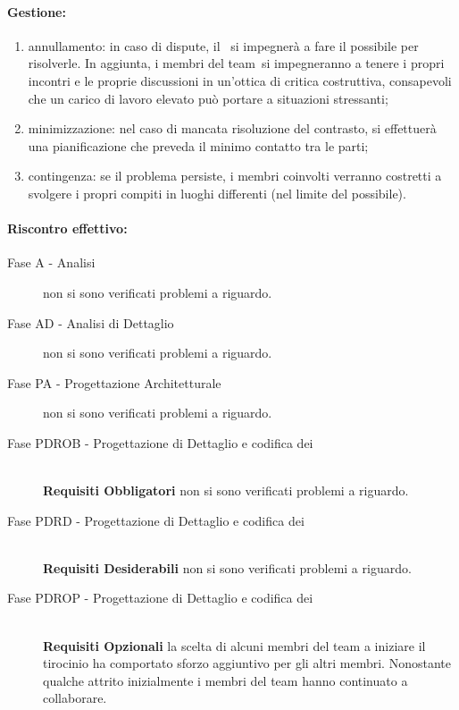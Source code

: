 \documentclass[../PianoProgetto.tex]{subfiles}
\begin{document}
	\paragraph*{Gestione:}
	\begin{enumerate}
		\item annullamento: in caso di dispute, il \responsabilediprogetto\ si impegnerà a fare il possibile per risolverle. In aggiunta, i membri del team\g\ si impegneranno a tenere i propri incontri e le proprie discussioni in un'ottica di critica costruttiva, consapevoli che un carico di lavoro elevato può portare a situazioni stressanti;
		\item minimizzazione: nel caso di mancata risoluzione del contrasto, si effettuerà una pianificazione che preveda il minimo contatto tra le parti; 
		\item contingenza: se il problema persiste, i membri coinvolti verranno costretti a svolgere i propri compiti in luoghi differenti (nel limite del possibile).
	\end{enumerate}	
	
	
	\paragraph*{Riscontro effettivo:}
		\begin{description}
			\item[Fase A - Analisi] non si sono verificati problemi a riguardo.
			\item[Fase AD - Analisi di Dettaglio] non si sono verificati problemi a riguardo.
			\item[Fase PA - Progettazione Architetturale] non si sono verificati problemi a riguardo.
			\item[Fase PDROB - Progettazione di Dettaglio e codifica dei]  \ \\
					\textbf{Requisiti Obbligatori} non si sono verificati problemi a riguardo.
			\item[Fase PDRD - Progettazione di Dettaglio e codifica dei] \ \\
					\textbf{Requisiti Desiderabili} non si sono verificati problemi a riguardo.
			\item[Fase PDROP - Progettazione di Dettaglio e codifica dei]  \ \\
					\textbf{Requisiti Opzionali} la scelta di alcuni membri del team a iniziare il tirocinio ha comportato sforzo aggiuntivo per gli altri membri. Nonostante qualche attrito inizialmente i membri del team hanno continuato a collaborare.
		\end{description}
\end{document}
